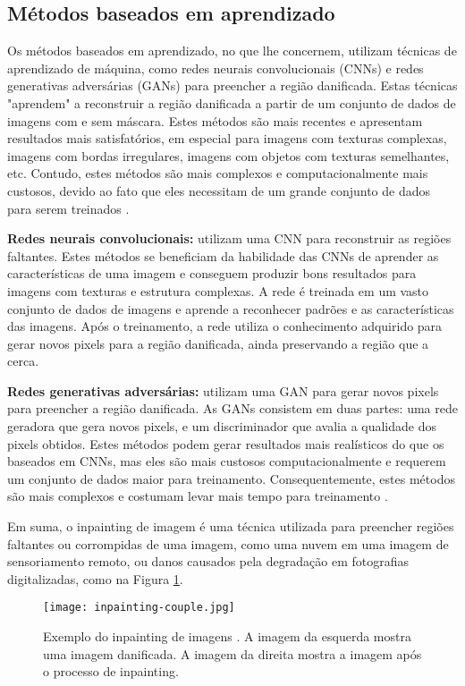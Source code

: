 
\subsection{Métodos baseados em aprendizado} \label{learn-based}
Os métodos baseados em aprendizado, no que lhe concernem, utilizam técnicas de aprendizado de máquina, como redes neurais convolucionais (CNNs) e redes generativas adversárias (GANs) para preencher a região danificada. Estas técnicas "aprendem" a reconstruir a região danificada a partir de um conjunto de dados de imagens com e sem máscara. Estes métodos são mais recentes e apresentam resultados mais satisfatórios, em especial para imagens com texturas complexas, imagens com bordas irregulares, imagens com objetos com texturas semelhantes, etc. Contudo, estes métodos são mais complexos e computacionalmente mais custosos, devido ao fato que eles necessitam de um grande conjunto de dados para serem treinados \cite{Goodfellow-et-al-2016}.

\begin{list}{}{}
\item \textbf{Redes neurais convolucionais:} \label{cnn-based-learning}
utilizam uma CNN para reconstruir as regiões faltantes. Estes métodos se beneficiam da habilidade das CNNs de aprender as características de uma imagem e conseguem produzir bons resultados para imagens com texturas e estrutura complexas. A rede é treinada em um vasto conjunto de dados de imagens e aprende a reconhecer padrões e as características das imagens. Após o treinamento, a rede utiliza o conhecimento adquirido para gerar novos pixels para a região danificada, ainda preservando a região que a cerca.

\item \textbf{Redes generativas adversárias:} \label{gan-based-learning}
utilizam uma GAN para gerar novos pixels para preencher a região danificada. As GANs consistem em duas partes: uma rede geradora que gera novos pixels, e um discriminador que avalia a qualidade dos pixels obtidos\cite{black2020evaluation}. Estes métodos podem gerar resultados mais realísticos do que os baseados em CNNs, mas eles são mais custosos computacionalmente e requerem um conjunto de dados maior para treinamento. Consequentemente, estes métodos são mais complexos e costumam levar mais tempo para treinamento \cite{pathakCVPR16context}.

\end{list}
Em suma, o inpainting de imagem é uma técnica utilizada para preencher regiões faltantes ou corrompidas de uma imagem, como uma nuvem em uma imagem de sensoriamento remoto, ou danos causados pela degradação em fotografias digitalizadas, como na Figura \ref{fig:inpainting-couple}.
\begin{figure}[ht]
\centering
\texttt{[image: inpainting-couple.jpg]}
\caption{Exemplo do inpainting de imagens \cite{wiki:inpainting-couple}. A imagem da esquerda mostra uma imagem danificada. A imagem da direita mostra a imagem após o processo de inpainting.}
\label{fig:inpainting-couple}
\end{figure}


